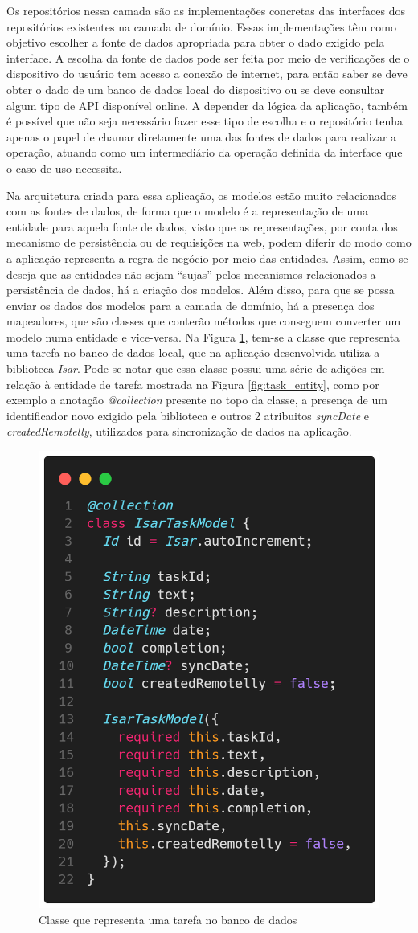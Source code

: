 \documentclass[12pt, %
openright, 
oneside, %
a4paper,    %
brazil]{facom-ufu-abntex2}
\begin{document}
Os repositórios nessa camada são as implementações concretas das interfaces dos repositórios existentes na camada de domínio. Essas implementações têm como objetivo escolher a fonte de dados apropriada para obter o dado exigido pela interface. A escolha da fonte de dados pode ser feita por meio de verificações de o dispositivo do usuário tem acesso a conexão de internet, para então saber se deve obter o dado de um banco de dados local do dispositivo ou se deve consultar algum tipo de API disponível online. A depender da lógica da aplicação, também é possível que não seja necessário fazer esse tipo de escolha e o repositório tenha apenas o papel de chamar diretamente uma das fontes de dados para realizar a operação, atuando como um intermediário da operação definida da interface que o caso de uso necessita.

Na arquitetura criada para essa aplicação, os modelos estão muito relacionados com as fontes de dados, de forma que o modelo é a representação de uma entidade para aquela fonte de dados, visto que as representações, por conta dos mecanismo de persistência ou de requisições na web, podem diferir do modo como a aplicação representa a regra de negócio por meio das entidades. Assim, como se deseja que as entidades não sejam ``sujas'' pelos mecanismos relacionados a persistência de dados, há a criação dos modelos. Além disso, para que se possa enviar os dados dos modelos para a camada de domínio, há a presença dos mapeadores, que são classes que conterão métodos que conseguem converter um modelo numa entidade e vice-versa. Na Figura \ref{fig:isar_task_model}, tem-se a classe que representa uma tarefa no banco de dados local, que na aplicação desenvolvida utiliza a biblioteca \textit{Isar}. Pode-se notar que essa classe possui uma série de adições em relação à entidade de tarefa mostrada na Figura \ref{fig:task_entity}, como por exemplo a anotação \textit{@collection} presente no topo da classe, a presença de um identificador novo exigido pela biblioteca e outros 2 atribuitos \textit{syncDate} e \textit{createdRemotelly}, utilizados para sincronização de dados na aplicação.

\begin{figure}[ht]
    \centering
    \includegraphics[width=.5\textwidth, trim={0 30 0 100}, clip]{figures/arch/isar_task_model.png}
    \caption{Classe que representa uma tarefa no banco de dados}
    \label{fig:isar_task_model}
\end{figure}
\end{document}
